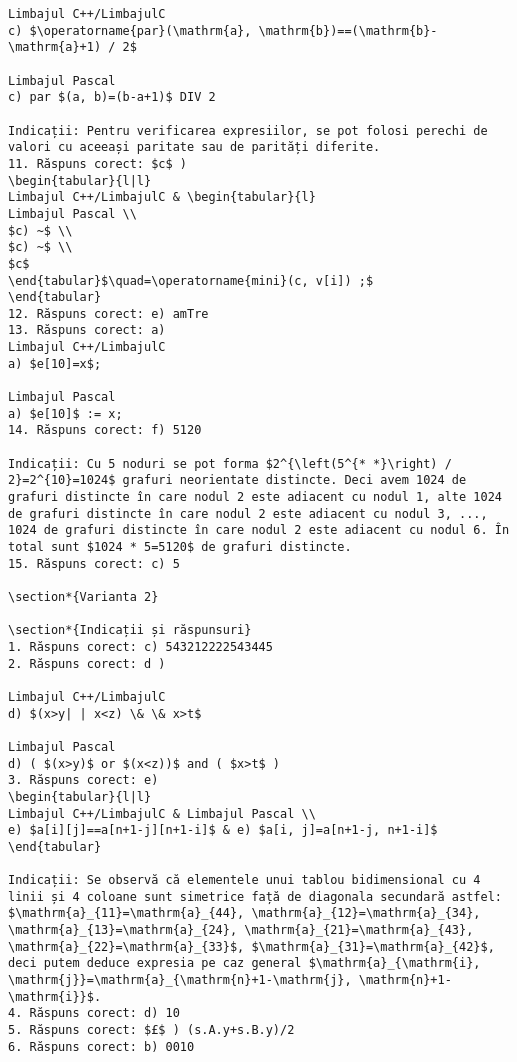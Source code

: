 \begin{verbatim}
Limbajul C++/LimbajulC
c) $\operatorname{par}(\mathrm{a}, \mathrm{b})==(\mathrm{b}-\mathrm{a}+1) / 2$

Limbajul Pascal
c) par $(a, b)=(b-a+1)$ DIV 2

Indicații: Pentru verificarea expresiilor, se pot folosi perechi de valori cu aceeași paritate sau de parități diferite.
11. Răspuns corect: $c$ )
\begin{tabular}{l|l} 
Limbajul C++/LimbajulC & \begin{tabular}{l} 
Limbajul Pascal \\
$c) ~$ \\
$c) ~$ \\
$c$
\end{tabular}$\quad=\operatorname{mini}(c, v[i]) ;$
\end{tabular}
12. Răspuns corect: e) amTre
13. Răspuns corect: a)
Limbajul C++/LimbajulC
a) $e[10]=x$;

Limbajul Pascal
a) $e[10]$ := x;
14. Răspuns corect: f) 5120

Indicații: Cu 5 noduri se pot forma $2^{\left(5^{* *}\right) / 2}=2^{10}=1024$ grafuri neorientate distincte. Deci avem 1024 de grafuri distincte în care nodul 2 este adiacent cu nodul 1, alte 1024 de grafuri distincte în care nodul 2 este adiacent cu nodul 3, ..., 1024 de grafuri distincte în care nodul 2 este adiacent cu nodul 6. În total sunt $1024 * 5=5120$ de grafuri distincte.
15. Răspuns corect: c) 5

\section*{Varianta 2}

\section*{Indicații și răspunsuri}
1. Răspuns corect: c) 543212222543445
2. Răspuns corect: d )

Limbajul C++/LimbajulC
d) $(x>y| | x<z) \& \& x>t$

Limbajul Pascal
d) ( $(x>y)$ or $(x<z))$ and ( $x>t$ )
3. Răspuns corect: e)
\begin{tabular}{l|l} 
Limbajul C++/LimbajulC & Limbajul Pascal \\
e) $a[i][j]==a[n+1-j][n+1-i]$ & e) $a[i, j]=a[n+1-j, n+1-i]$
\end{tabular}

Indicații: Se observă că elementele unui tablou bidimensional cu 4 linii și 4 coloane sunt simetrice față de diagonala secundară astfel: $\mathrm{a}_{11}=\mathrm{a}_{44}, \mathrm{a}_{12}=\mathrm{a}_{34}, \mathrm{a}_{13}=\mathrm{a}_{24}, \mathrm{a}_{21}=\mathrm{a}_{43}, \mathrm{a}_{22}=\mathrm{a}_{33}$, $\mathrm{a}_{31}=\mathrm{a}_{42}$, deci putem deduce expresia pe caz general $\mathrm{a}_{\mathrm{i}, \mathrm{j}}=\mathrm{a}_{\mathrm{n}+1-\mathrm{j}, \mathrm{n}+1-\mathrm{i}}$.
4. Răspuns corect: d) 10
5. Răspuns corect: $£$ ) (s.A.y+s.B.y)/2
6. Răspuns corect: b) 0010


\end{verbatim}
